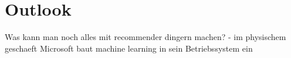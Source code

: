 

\section{Outlook}

Was kann man noch alles mit recommender dingern machen?
- im physischem geschaeft
Microsoft baut machine learning in sein Betriebssystem ein

